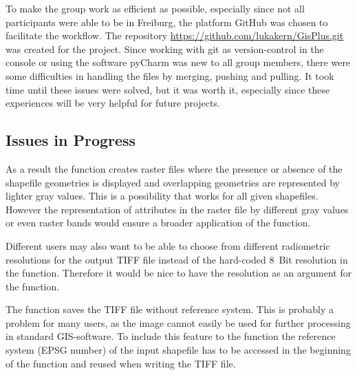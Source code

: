 \documentclass[10pt, a4paper]{article}
\begin{document}
	To make the group work as efficient as possible, especially since not all participants were able to be in Freiburg, the platform GitHub was chosen to facilitate the workflow. The repository \url{https://github.com/lukakern/GisPlus.git} was created for the project. Since working with git as version-control in the console or using the software pyCharm was new to all group members, there were some difficulties in handling the files by merging, pushing and pulling. It took time until these issues were solved, but it was worth it, especially since these experiences will be very helpful for future projects.
	
	\subsection*{Issues in Progress}
	As a result the function creates raster files where the presence or absence of the shapefile geometries is displayed and overlapping geometries are represented by lighter gray values. This is a possibility that works for all given shapefiles. However the representation of attributes in the raster file by different gray values or even raster bands would ensure a broader application of the function.\
	
	Different users may also want to be able to choose from different radiometric resolutions for the output TIFF file instead of the hard-coded \SI{8}{Bit} resolution in the function. Therefore it would be nice to have the resolution as an argument for the function.\
	
	The function saves the TIFF file without reference system. This is probably a problem for many users, as the image cannot easily be used for further processing in standard GIS-software. To include this feature to the function the reference system (EPSG number) of the input shapefile has to be accessed in the beginning of the function and reused when writing the TIFF file.
	
	\begin{figure}[!htbp]
		\centering
	\end{figure}
	
	
	
	
\end{document}
